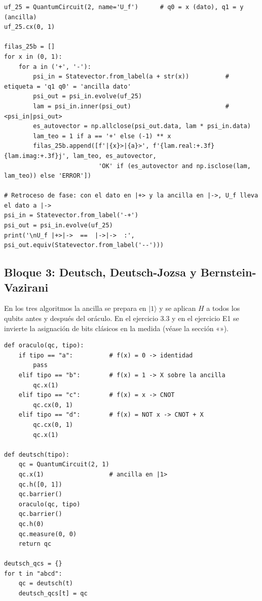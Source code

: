 \begin{lstlisting}[caption={Ejercicio 2.5: oráculo $f(x)=x$ y cálculo de los autovalores $\lambda=\langle\psi_{in}|\psi_{out}\rangle$.},label={lst:b2_oraculo}]
uf_25 = QuantumCircuit(2, name='U_f')      # q0 = x (dato), q1 = y (ancilla)
uf_25.cx(0, 1)

filas_25b = []
for x in (0, 1):
    for a in ('+', '-'):
        psi_in = Statevector.from_label(a + str(x))          # etiqueta = 'q1 q0' = 'ancilla dato'
        psi_out = psi_in.evolve(uf_25)
        lam = psi_in.inner(psi_out)                          # <psi_in|psi_out>
        es_autovector = np.allclose(psi_out.data, lam * psi_in.data)
        lam_teo = 1 if a == '+' else (-1) ** x
        filas_25b.append([f'|{x}>|{a}>', f'{lam.real:+.3f}{lam.imag:+.3f}j', lam_teo, es_autovector,
                          'OK' if (es_autovector and np.isclose(lam, lam_teo)) else 'ERROR'])

# Retroceso de fase: con el dato en |+> y la ancilla en |->, U_f lleva el dato a |->
psi_in = Statevector.from_label('-+')
psi_out = psi_in.evolve(uf_25)
print('\nU_f |+>|->  ==  |->|->  :', psi_out.equiv(Statevector.from_label('--')))
\end{lstlisting}

\subsection{Bloque 3: Deutsch, Deutsch-Jozsa y Bernstein-Vazirani}

En los tres algoritmos la ancilla se prepara en $|1\rangle$ y se aplican $H$ a todos los qubits antes y después del oráculo. En el ejercicio 3.3 y en el ejercicio E1 se invierte la asignación de bits clásicos en la medida (véase la sección «»).

\begin{lstlisting}[caption={Ejercicio 3.1: oráculos de una variable y circuito de Deutsch.},label={lst:b3_deutsch}]
def oraculo(qc, tipo):
    if tipo == "a":          # f(x) = 0 -> identidad
        pass
    elif tipo == "b":        # f(x) = 1 -> X sobre la ancilla
        qc.x(1)
    elif tipo == "c":        # f(x) = x -> CNOT
        qc.cx(0, 1)
    elif tipo == "d":        # f(x) = NOT x -> CNOT + X
        qc.cx(0, 1)
        qc.x(1)

def deutsch(tipo):
    qc = QuantumCircuit(2, 1)
    qc.x(1)                  # ancilla en |1>
    qc.h([0, 1])
    qc.barrier()
    oraculo(qc, tipo)
    qc.barrier()
    qc.h(0)
    qc.measure(0, 0)
    return qc

deutsch_qcs = {}
for t in "abcd":
    qc = deutsch(t)
    deutsch_qcs[t] = qc
\end{lstlisting}

